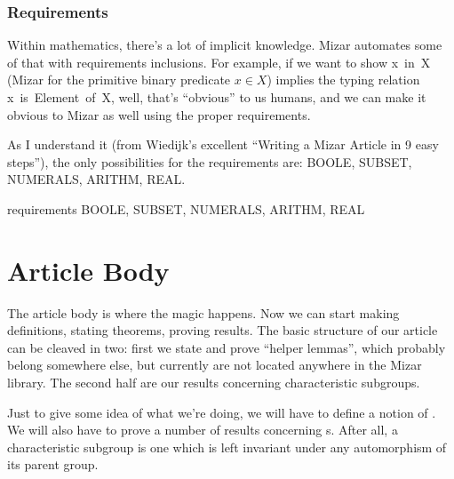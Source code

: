 \subsubsection{Requirements} Within mathematics, there's a lot of implicit
knowledge. Mizar automates some of that with {\Tt{}requirements\nwendquote}
inclusions. For example, if we want to show {\Tt{}x\ in\ X\nwendquote}
(Mizar for the primitive binary predicate $x\in X$) implies
the typing relation {\Tt{}x\ is\ Element\ of\ X\nwendquote}, well, that's ``obvious'' to
us humans, and we can make it obvious to Mizar as well using the proper
requirements.

\begin{remark}
As I understand it (from Wiedijk's excellent ``Writing a Mizar Article
in 9 easy steps''), the only possibilities for the {\Tt{}requirements\nwendquote} are:
{\Tt{}BOOLE\nwendquote}, {\Tt{}SUBSET\nwendquote}, {\Tt{}NUMERALS\nwendquote}, {\Tt{}ARITHM\nwendquote}, {\Tt{}REAL\nwendquote}.
\end{remark}

\nwenddocs{}\endmoddef\nwstartdeflinemarkup{}\nwenddeflinemarkup
requirements BOOLE, SUBSET, NUMERALS, ARITHM, REAL
\nwendcode{}\nwdocspar
\nwenddocs{}%
\section{Article Body}\label{sec:characteristic:preparatory:start}

The article body is where the magic happens. Now we can start making
definitions, stating theorems, proving results. The basic structure of
our article can be cleaved in two: first we state and prove ``helper
lemmas'', which probably belong somewhere else, but currently are not
located anywhere in the Mizar library. The second half are our results
concerning characteristic subgroups.

Just to give some idea of what we're doing, we will have to define a
notion of {\Tt{}\nwendquote}. We will also have to prove a number of
results concerning {\Tt{}\nwendquote}s. After all, a characteristic
subgroup is one which is left invariant under any automorphism of its
parent group.

